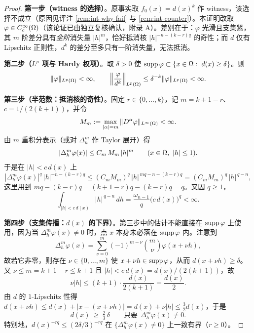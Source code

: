 \begin{proof}
\textbf{第一步（witness 的选择）}。原事实取 $f_0(x)=d(x)^k$ 作 witness，该选择不成立（原因见评注 \ref{rem:int-why-fail} 与 \ref{rem:int-counter}）。本证明改取 $\varphi\in C_c^\infty(\Omega)$（该论证已由独立复核确认，附录 A）。差别在于：$\varphi$ 光滑且支集紧，其 $m$ 阶差分具有\emph{全阶}消失量 $|h|^m$，恰好抵消核 $|h|^{-n-(k-r)q}$ 的奇性；而 $d$ 仅有 Lipschitz 正则性，$d^k$ 的差分至多只有一阶消失量，无法抵消。

\textbf{第二步（$L^p$ 项与 Hardy 权项）}。取 $\delta>0$ 使 $\supp\varphi\subset\{x\in\Om:\ d(x)\ge\delta\}$。则
\[
  \|\varphi\|_{L^p(\Omega)}<\infty,\qquad
  \Big\|\frac{\varphi}{d^k}\Big\|_{L^p(\Omega)}\le\delta^{-k}\|\varphi\|_{L^p(\Omega)}<\infty .
\]

\textbf{第三步（半范数：抵消核的奇性）}。固定 $r\in\{0,\dots,k\}$，记 $m=k+1-r$、$c=1/(2(k+1))$，并令
\[
  M_m:=\max_{|\alpha|=m}\|D^\alpha\varphi\|_{L^\infty(\Omega)}<\infty .
\]
由 $m$ 重积分表示（或对 $\Delta_h^m$ 作 Taylor 展开）得
\begin{equation}\label{eq:int-diff}
  |\Delta_h^m\varphi(x)|\le C_m\,M_m\,|h|^m\qquad (x\in\Om,\ |h|\le1).
\end{equation}
于是在 $|h|<c\,d(x)$ 上
\[
  |\Delta_h^m\varphi(x)|^q\,|h|^{-n-(k-r)q}
  \le (C_mM_m)^q\,|h|^{\,mq-n-(k-r)q}
  =(C_mM_m)^q\,|h|^{\,q-n},
\]
这里用到 $mq-(k-r)q=(k+1-r)q-(k-r)q=q$。又因 $q\ge1$，
\[
  \int_{|h|<c\,d(x)}|h|^{\,q-n}\,dh=\frac{\omega_{n-1}}{q}\big(c\,d(x)\big)^q<\infty .
\]

\textbf{第四步（支集传播：$d(x)$ 的下界）}。第三步中的估计不能直接在 $\operatorname{supp}\varphi$ 上使用，因为当
$\Delta_h^m\varphi(x)\ne0$ 时，点 $x$ 本身未必落在 $\operatorname{supp}\varphi$ 内。注意到
\[
  \Delta_h^m\varphi(x)=\sum_{\nu=0}^{m}(-1)^{m-\nu}\binom{m}{\nu}\varphi(x+\nu h),
\]
故若它非零，则存在 $\nu\in\{0,\dots,m\}$ 使 $x+\nu h\in\operatorname{supp}\varphi$，从而 $d(x+\nu h)\ge\delta$。又 $\nu\le m=k+1-r\le k+1$ 且 $|h|<c\,d(x)=d(x)/(2(k+1))$，故
\[
  \nu|h|\le(k+1)\cdot\frac{d(x)}{2(k+1)}=\frac{d(x)}{2}.
\]
由 $d$ 的 $1$-Lipschitz 性得 $d(x+\nu h)\le d(x)+|x-(x+\nu h)|=d(x)+\nu|h|\le\tfrac32d(x)$，于是
\begin{equation}\label{eq:int-support}
  d(x)\ \ge\ \tfrac23\,\delta\qquad\text{只要}\ \ \Delta_h^m\varphi(x)\ne0 .
\end{equation}
特别地，$d(x)^{-rq}\le(2\delta/3)^{-rq}$ 在 $\{\Delta_h^m\varphi(x)\ne0\}$ 上一致有界（$r\ge0$）。


\end{proof}
